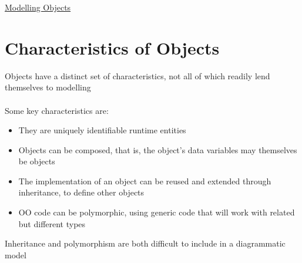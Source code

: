 \documentclass{article}[18pt]
\begin{document}
\begin{center}
\underline{\huge Modelling Objects}
\end{center}
\section{Characteristics of Objects}
Objects have a distinct set of characteristics, not all of which readily lend themselves to modelling\\
\\
Some key characteristics are:
\begin{itemize}
	\item They are uniquely identifiable runtime entities
	\item Objects can be composed, that is, the object's data variables may themselves be objects
	\item The implementation of an object can be reused and extended through inheritance, to define other objects
	\item OO code can be polymorphic, using generic code that will work with related but different types
\end{itemize}
Inheritance and polymorphism are both difficult to include in a diagrammatic model
\end{document}
